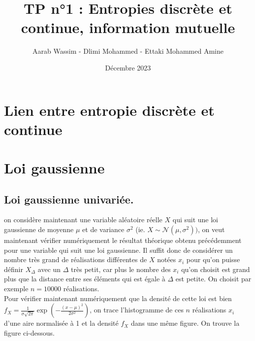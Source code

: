 \documentclass[a4paper]{article}
\title{TP n°1 : Entropies discrète et continue, information mutuelle}
\author{Aarab Wassim - Dlimi Mohammed - Ettaki Mohammed Amine}
\date{Décembre 2023}
\begin{document}
\maketitle
\tableofcontents
\newpage
\section{Lien entre entropie discrète et continue}


\newpage

\section{Loi gaussienne}
\subsection{Loi gaussienne univariée.}
on considère maintenant une variable aléatoire réelle $X$ qui suit une loi gaussienne de moyenne $\mu$ et de variance $\sigma^{2}$ (ie. $X \sim \mathcal{N}(\mu, \sigma^{2}))$, on veut maintenant vérifier numériquement le résultat théorique obtenu précédemment pour une variable qui suit une loi gaussienne. Il suffit donc de considérer un nombre très grand de réalisations différentes de $X$ notées $x_i$ pour qu'on puisse définir $X_{\Delta}$ avec un $\Delta$ très petit, car plus le nombre des $x_i$ qu'on choisit est grand plus que la distance entre ses éléments qui est égale à $\Delta$ est petite. On choisit par exemple $n=10000$ réalisations.\\
Pour vérifier maintenant numériquement que la densité de cette loi est bien $f_{X}=\frac{1}{\sigma\sqrt{2\pi}}\exp\left(-\frac{(x-\mu)^{2}}{2\sigma^2}\right)$, on trace l'histogramme de ces $n$ réalisations $x_{i}$ d'une aire normalisée à 1 et la densité $f_{X}$ dans une même figure. On trouve la figure ci-dessous.
\end{document}
